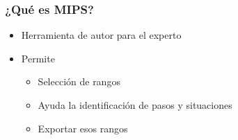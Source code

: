\begin{frame}
	\frametitle{¿Qu\'e es MIPS?}
	
	\begin{itemize}
		\item Herramienta de autor para el experto
		\item Permite
		\begin{itemize}
			\item Selecci\'on de rangos
			\item Ayuda la identificaci\'on de pasos y situaciones
			\item Exportar esos rangos
		\end{itemize}
	\end{itemize}
\end{frame}